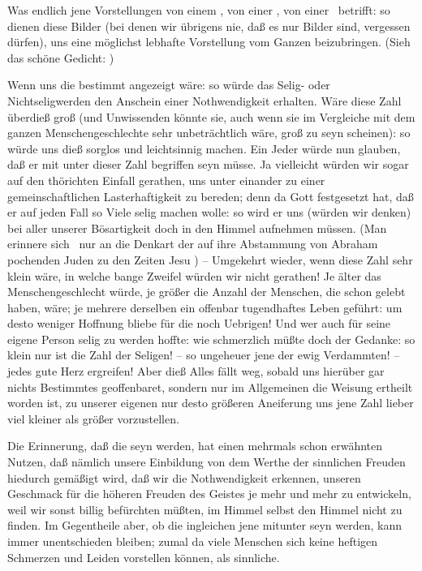 \begin{aufza}
\begin{aufzb}
\item Was endlich jene  Vorstellungen von einem , von einer , von einer  \usw\ betrifft: so dienen diese Bilder (bei denen wir übrigens nie, daß es nur Bilder sind, vergessen dürfen), uns eine möglichst lebhafte Vorstellung vom Ganzen beizubringen. (Sieh das schöne Gedicht:  \usw )
\end{aufzb}
\item Wenn uns die  bestimmt angezeigt wäre: so würde das Selig- oder Nichtseligwerden den Anschein einer Nothwendigkeit erhalten. Wäre diese Zahl überdieß groß (und Unwissenden könnte sie, auch wenn sie im Vergleiche mit dem ganzen Menschengeschlechte sehr unbeträchtlich wäre, groß zu seyn scheinen): so würde uns dieß sorglos und leichtsinnig machen. Ein Jeder würde nun glauben, daß er mit unter dieser Zahl begriffen seyn müsse. Ja vielleicht würden wir sogar auf den thörichten Einfall gerathen, uns unter einander zu einer gemeinschaftlichen Lasterhaftigkeit zu bereden; denn da Gott festgesetzt hat, daß er auf jeden Fall so Viele selig machen wolle: so wird er uns (würden wir denken) bei aller unserer Bösartigkeit doch in den Himmel aufnehmen müssen. (Man erinnere sich \zB\ nur an die Denkart der auf ihre Abstammung von Abraham pochenden Juden zu den Zeiten Jesu ) -- Umgekehrt wieder, wenn diese Zahl sehr klein wäre, in welche bange Zweifel würden wir nicht gerathen! Je älter das Menschengeschlecht würde, je größer die Anzahl der Menschen, die schon gelebt haben, wäre; je mehrere derselben ein offenbar tugendhaftes Leben geführt: um desto weniger Hoffnung bliebe für die noch Uebrigen! Und wer auch für seine eigene Person selig zu werden hoffte: wie schmerzlich müßte doch der Gedanke: so klein nur ist die Zahl der Seligen! -- so ungeheuer jene der ewig Verdammten! -- jedes gute Herz ergreifen! Aber dieß Alles fällt weg, sobald uns hierüber gar nichts Bestimmtes geoffenbaret, sondern nur im Allgemeinen die Weisung ertheilt worden ist, zu unserer eigenen nur desto größeren Aneiferung uns jene Zahl lieber viel kleiner als größer vorzustellen.
\item Die Erinnerung, daß die  seyn werden, hat einen mehrmals schon erwähnten Nutzen, daß nämlich unsere Einbildung von dem Werthe der sinnlichen Freuden hiedurch gemäßigt wird, daß wir die Nothwendigkeit erkennen, unseren Geschmack für die höheren Freuden des Geistes je mehr und mehr zu entwickeln, weil wir sonst billig befürchten müßten, im Himmel selbst den Himmel nicht zu finden. Im Gegentheile aber, ob die  ingleichen jene  mitunter  seyn werden, kann immer unentschieden bleiben; zumal da viele Menschen sich keine heftigen Schmerzen und Leiden vorstellen können, als sinnliche.

\end{aufza}
